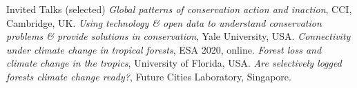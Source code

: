 \begin{rubric}{Invited Talks (selected)}
\entry*[2022] \emph{Global patterns of conservation action and inaction}, CCI, Cambridge, UK.
\entry*[2021] \emph{Using technology \& open data to understand conservation problems \& provide solutions in conservation}, Yale University, USA.
\entry*[2021] \emph{Connectivity under climate change in tropical forests}, ESA 2020, online.
\entry*[2019] \emph{Forest loss and climate change in the tropics}, University of Florida, USA.
\entry*[2016] \emph{Are selectively logged forests climate change ready?}, Future Cities Laboratory, Singapore.
\end{rubric}